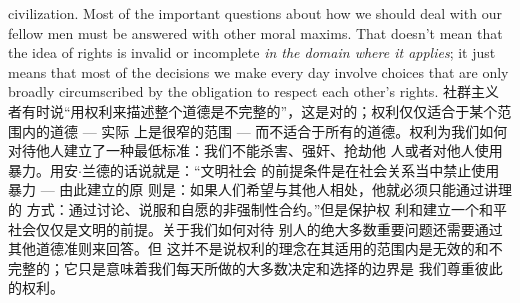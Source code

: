\begin{paracol}{2}
civilization. Most of the important questions about how we
should deal with our fellow men must be answered with other
moral maxims. That doesn't mean that the idea of rights is invalid or incomplete \textit{in the domain where it applies}; it just means
that most of the decisions we make every day involve choices
that are only broadly circumscribed by the obligation to respect
each other's rights.
\switchcolumn
社群主义者有时说“用权利来描述整个道德是不完整的”，这是对的；权利仅仅适合于某个范围内的道德 --- 实际
上是很窄的范围 --- 而不适合于所有的道德。权利为我们如何
对待他人建立了一种最低标准：我们不能杀害、强奸、抢劫他
人或者对他人使用暴力。用安$\cdot$兰德的话说就是：“文明社会
的前提条件是在社会关系当中禁止使用暴力 --- 由此建立的原
则是：如果人们希望与其他人相处，他就必须只能通过讲理的
方式：通过讨论、说服和自愿的非强制性合约。”但是保护权
利和建立一个和平社会仅仅是文明的前提。关于我们如何对待
别人的绝大多数重要问题还需要通过其他道德准则来回答。但
这并不是说权利的理念在其适用的范围内是无效的和不完整的；它只是意味着我们每天所做的大多数决定和选择的边界是
我们尊重彼此的权利。



\end{paracol}
